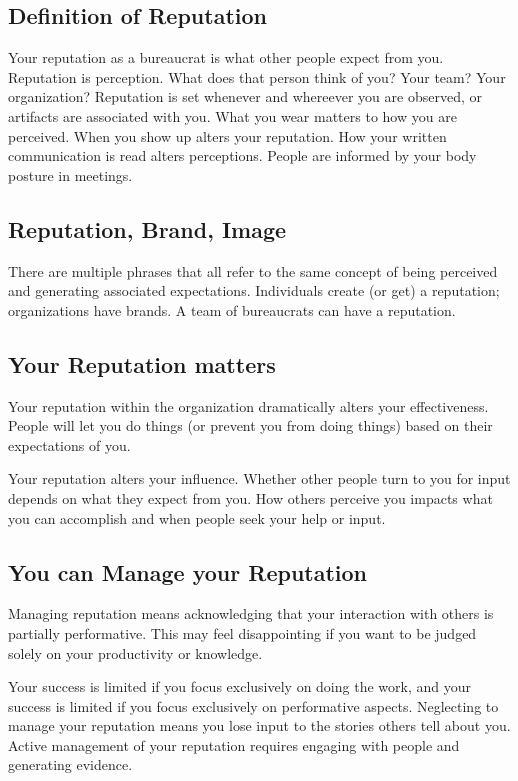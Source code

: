 \subsection*{Definition of Reputation}

Your \gls{reputation} as a bureaucrat is what other people expect from you. \iftoggle{glossaryinmargin}{\marginpar{[Glossary]}}{}%
%
Reputation is perception. What does that person think of you? Your team? Your organization? 
Reputation is set whenever and whereever you are observed, or artifacts are associated with you. 
What you wear matters to how you are perceived. When you show up alters your reputation. How your written communication is read alters perceptions. People are informed by your body posture in meetings. 

\subsection*{Reputation, Brand, Image}

There are multiple phrases that all refer to the same concept of being perceived and generating associated expectations. Individuals create (or get) a reputation; organizations have brands. A team of bureaucrats can have a reputation. 

\subsection*{Your Reputation matters}

Your reputation within the organization dramatically alters your effectiveness. People will let you do things (or prevent you from doing things) based on their expectations of you. 

Your reputation alters your influence. Whether other people turn to you for input depends on what they expect from you. How others perceive you impacts what you can accomplish and when people seek your help or input.

\subsection*{You can Manage your Reputation}

Managing reputation means acknowledging that your interaction with others is partially performative. This may feel disappointing if you want to be judged solely on your productivity or knowledge. 

Your success is limited if you focus exclusively on doing the work, and your success is limited if you focus exclusively on performative aspects. 
Neglecting to manage your reputation means you lose input to the stories others tell about you. Active management of your reputation requires engaging with people and generating evidence. 

